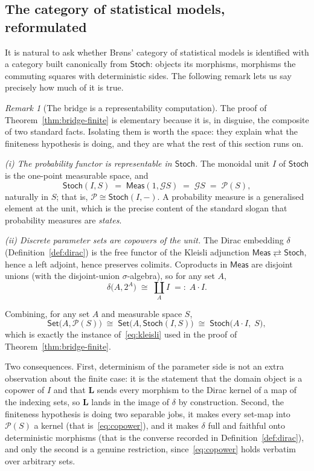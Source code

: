 \documentclass[11pt,a4paper]{article}
\theoremstyle{plain}
\theoremstyle{definition}
\theoremstyle{remark}
\newtheorem{remark}[theorem]{Remark}
\newcommand{\cat}[1]{\mathsf{#1}}
\newcommand{\Meas}{\cat{Meas}}
\newcommand{\Set}{\cat{Set}}
\newcommand{\Stoch}{\cat{Stoch}}
\newcommand{\G}{\mathcal{G}}
\newcommand{\Prb}{\mathcal{P}}
\newcommand{\del}{\delta}
\begin{document}
\subsection{The category of statistical models, reformulated}\label{sec:Bref}

It is natural to ask whether Br\o ns' category of statistical models is
identified with a category built canonically from $\Stoch$: objects its
morphisms, morphisms the commuting squares with deterministic sides. The following remark lets us say precisely
how much of it is true.

\begin{remark}[The bridge is a representability computation]\label{rem:repr}
The proof of Theorem~\ref{thm:bridge-finite} is elementary because it is, in disguise, the composite of
two standard facts. Isolating them is worth the space: they explain what the finiteness
hypothesis is doing, and they are what the rest of this section runs on.

\emph{(i) The probability functor is representable in $\Stoch$.} The monoidal
unit $I$ of $\Stoch$ is the one-point measurable space, and
\[
\Stoch(I,S) \;=\; \Meas(1,\G S) \;=\; \G S \;=\; \Prb(S),
\]
naturally in $S$; that is, $\Prb \cong \Stoch(I,-)$. A probability measure is a
generalised element at the unit, which is the precise content of the
standard slogan that probability measures are \emph{states}.

\emph{(ii) Discrete parameter sets are copowers of the unit.} The Dirac
embedding $\del$ (Definition~\ref{def:dirac}) is the free functor of the
Kleisli adjunction $\Meas \rightleftarrows \Stoch$, hence a left adjoint,
hence preserves colimits. Coproducts in $\Meas$ are disjoint unions (with the
disjoint-union $\sigma$-algebra), so for any set $A$,
\[
\del\bigl(A,2^A \bigr) \;\cong\; \coprod_{A} I \;=:\; A\cdot I .
\]

Combining, for any set $A$ and measurable space $S$,
\begin{equation}\label{eq:copower}
\Set\bigl(A,\Prb(S)\bigr)
\;\cong\;
\Set\bigl(A,\Stoch(I,S)\bigr)
\;\cong\;
\Stoch\bigl(A\cdot I,\;S\bigr),
\end{equation}
which is exactly the instance of~\eqref{eq:kleisli} used in the proof of
Theorem~\ref{thm:bridge-finite}.

Two consequences. First, determinism of the parameter side is not an extra
observation about the finite case: it is the statement that the domain object
is a copower of $I$ and that $\mathbf{L}$ sends every morphism to the Dirac
kernel of a map of the indexing sets, so $\mathbf{L}$ lands in the image of
$\del$ by construction.
Second, the finiteness hypothesis is doing two separable jobs, it makes
every set-map into $\Prb(S)$ a kernel (that is~\eqref{eq:copower}), and it
makes $\del$ full and faithful onto deterministic morphisms (that is the
converse recorded in Definition~\ref{def:dirac}), and only the second is a
genuine restriction,
since~\eqref{eq:copower} holds verbatim over arbitrary sets.


\end{remark}
\end{document}
